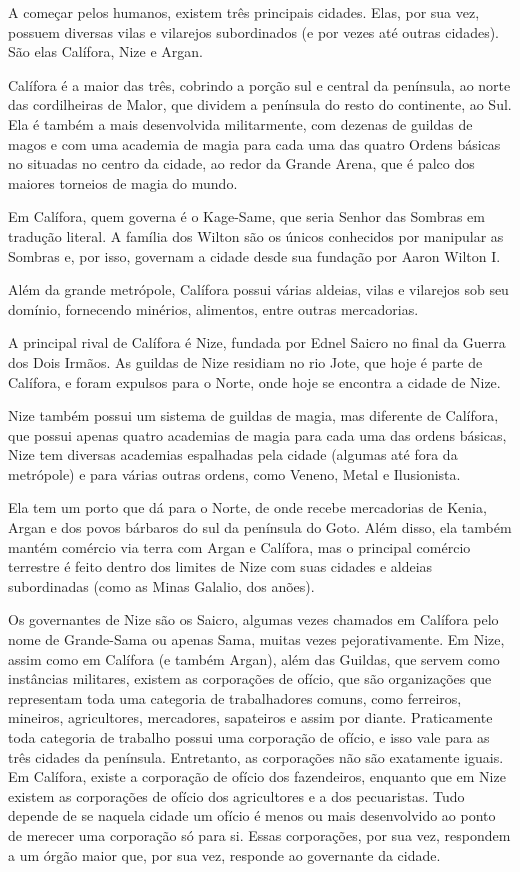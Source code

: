 \documentclass{RPG_Adventure}[2021/10/20]
\begin{document}
A começar pelos humanos, existem três principais cidades. Elas, por sua vez,
possuem diversas vilas e vilarejos subordinados (e por vezes até outras
cidades). São elas Calífora, Nize e Argan.

Calífora é a maior das três, cobrindo a porção sul e central da península, ao
norte das cordilheiras de Malor, que dividem a península do resto do continente,
ao Sul. Ela é também a mais desenvolvida militarmente, com dezenas de guildas
de magos e com uma academia de magia para cada uma das quatro Ordens básicas no
situadas no centro da cidade, ao redor da Grande Arena, que é palco dos maiores
torneios de magia do mundo.

Em Calífora, quem governa é o Kage-Same, que seria Senhor das Sombras em
tradução literal. A família dos Wilton são os únicos conhecidos por manipular as
Sombras e, por isso, governam a cidade desde sua fundação por Aaron Wilton I.

Além da grande metrópole, Calífora possui várias aldeias, vilas e vilarejos sob
seu domínio, fornecendo minérios, alimentos, entre outras mercadorias.

A principal rival de Calífora é Nize, fundada por Ednel Saicro no final da
Guerra dos Dois Irmãos. As guildas de Nize residiam no rio Jote, que hoje é
parte de Calífora, e foram expulsos para o Norte, onde hoje se encontra a cidade
de Nize.

Nize também possui um sistema de guildas de magia, mas diferente de Calífora,
que possui apenas quatro academias de magia para cada uma das ordens básicas,
Nize tem diversas academias espalhadas pela cidade (algumas até fora da
metrópole) e para várias outras ordens, como Veneno, Metal e Ilusionista.

Ela tem um porto que dá para o Norte, de onde recebe mercadorias de Kenia, Argan
e dos povos bárbaros do sul da península do Goto. Além disso, ela também mantém
comércio via terra com Argan e Calífora, mas o principal comércio terrestre é
feito dentro dos limites de Nize com suas cidades e aldeias subordinadas (como
as Minas Galalio, dos anões).

Os governantes de Nize são os Saicro, algumas vezes chamados em Calífora pelo
nome de Grande-Sama ou apenas Sama, muitas vezes pejorativamente. Em Nize, assim
como em Calífora (e também Argan), além das Guildas, que servem como instâncias
militares, existem as corporações de ofício, que são organizações que
representam toda uma categoria de trabalhadores comuns, como ferreiros,
mineiros, agricultores, mercadores, sapateiros e assim por diante. Praticamente
toda categoria de trabalho possui uma corporação de ofício, e isso vale para as
três cidades da península. Entretanto, as corporações não são exatamente iguais.
Em Calífora, existe a corporação de ofício dos fazendeiros, enquanto que em Nize
existem as corporações de ofício dos agricultores e a dos pecuaristas. Tudo
depende de se naquela cidade um ofício é menos ou mais desenvolvido ao ponto de
merecer uma corporação só para si. Essas corporações, por sua vez, respondem a
um órgão maior que, por sua vez, responde ao governante da cidade.
\end{document}
